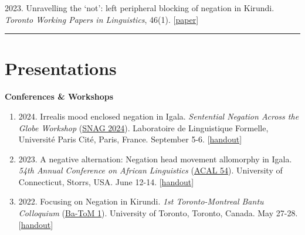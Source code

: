 \documentclass[margin,line]{resume}
\begin{document}
\begin{resume}
	 {2023. Unravelling the `not': left peripheral blocking of negation in Kirundi. \textit{Toronto Working Papers in Linguistics}, 46(1). [\href{https://twpl.library.utoronto.ca/index.php/twpl/article/view/39257}{paper}]}%

	\vspace{-0.9em}\rule{\textwidth}{0.4pt}
	

	\vspace{-0.5em}

	\section{\mysidestyle Presentations}

	\textbf{Conferences \& Workshops}
	\begin{enumerate}[-, leftmargin=1em, topsep=2pt]
		
		\item[] {2024. Irrealis mood enclosed negation in Igala. {\it Sentential Negation Across the Globe Workshop} (\href{https://parissnag.com/conf}{SNAG 2024}). Laboratoire de Linguistique Formelle, Universit\'{e} Paris Cit\'{e}, Paris, France. September 5-6. [\href{https://parissnag.com/conf/program/chaperon}{handout}]}
		
		\item[] {2023. A negative alternation: Negation head movement allomorphy in Igala. {\it 54th Annual Conference on African Linguistics} (\href{https://uconnuecs.cventevents.com/event/aef2d257-6a6a-41b5-b83d-2c6efc60aac5/summary}{ACAL 54}). University of Connecticut, Storrs, USA. June 12-14. [\href{run:../handouts/chaperon_ACAL54_Igala_Negation-handout.pdf}{handout}]}
		
		\item[] {2022. Focusing on Negation in Kirundi. {\it 1st Toronto-Montreal Bantu Colloquium} (\href{https://mcling.blogs.mcgill.ca/2022/05/24/mcgill-at-ba-tom-1/}{Ba-ToM 1}). University of Toronto, Toronto, Canada. May 27-28. [\href{run:../handouts/chaperon_batom_kirundi_negn-handout.pdf}{handout}]}
	\end{enumerate}
	
\begin{comment}
	\textbf{Reading Group \& Labs}
	\begin{enumerate}[-, leftmargin=1em, topsep=2pt]
		\item[] {2023. \href{https://mcling.blogs.mcgill.ca/2023/01/15/mull-lab-1-17-brandon-chaperon/}{A negative alternation: Negation head movement allomorphy in Igala}. \href{https://mull-lab.org/}{MULL Lab} meeting. McGill University. January 17.}


\end{comment}
\end{resume}
\end{document}
